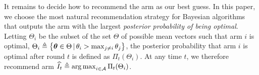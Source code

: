It remains to decide how to recommend the arm as our best guess. %
In this paper, we choose the most natural recommendation strategy for Bayesian algorithms that outputs the arm with the largest \emph{posterior probability of being optimal}. Letting $\Theta_i$ be the subset of the set $\Theta$ of possible mean vectors such that arm $i$ is optimal, $\Theta_i \triangleq \big\{ {\boldsymbol \theta}\in\Theta \,|\, \theta_i > \max_{j\neq i}\theta_j \big\}$, the posterior probability that arm $i$ is optimal after round $t$ is defined as $\Pi_{t}(\Theta_i)$. At any time $t$, we therefore recommend  arm $\widehat{I}_t \triangleq \operatorname*{arg\,max}_{i\in\mathcal{A}} \Pi_{t}(\Theta_i)$.
